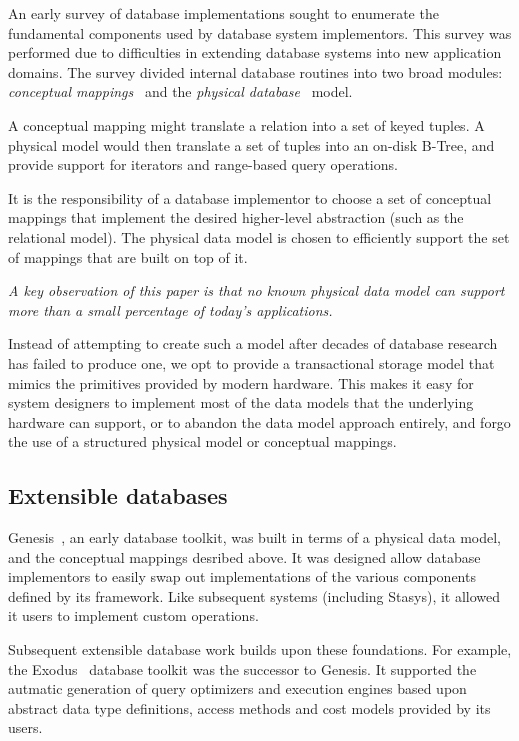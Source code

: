 \documentclass[letterpaper,twocolumn,10pt]{article}
\newcommand{\yad}{Stasys\xspace}
\begin{document}
An early survey of database implementations sought to enumerate the
fundamental components used by database system implementors.  This
survey was performed due to difficulties in extending database systems
into new application domains.  The survey divided internal database
routines into two broad modules: {\em conceptual
mappings}~\cite{batoryConceptual} and the {\em physical
database}~\cite{batoryPhysical} model.

A conceptual mapping might translate a relation into a set of keyed
tuples.  A physical model would then translate a set of tuples into an
on-disk B-Tree, and provide support for iterators and range-based query
operations.

It is the responsibility of a database implementor to choose a set of
conceptual mappings that implement the desired higher-level
abstraction (such as the relational model).  The physical data model
is chosen to efficiently support the set of mappings that are built on
top of it.

{\em A key observation of this paper is that no known physical data model
can support more than a small percentage of today's applications.}

Instead of attempting to create such a model after decades of database
research has failed to produce one, we opt to provide a transactional
storage model that mimics the primitives provided by modern hardware.
This makes it easy for system designers to implement most of the data
models that the underlying hardware can support, or to
abandon the data model approach entirely, and forgo the use of a
structured physical model or conceptual mappings.

\subsection{Extensible databases}

Genesis~\cite{genesis}, an early database toolkit, was built in terms
of a physical data model, and the conceptual mappings desribed above.
It was designed allow database implementors to easily swap out
implementations of the various components defined by its framework.
Like subsequent systems (including \yad), it allowed it users to
implement custom operations.

Subsequent extensible database work builds upon these foundations.
For example, the Exodus~\cite{exodus} database toolkit was the successor to
Genesis. It supported the autmatic generation of query optimizers and
execution engines based upon abstract data type definitions, access
methods and cost models provided by its users.
\end{document}
